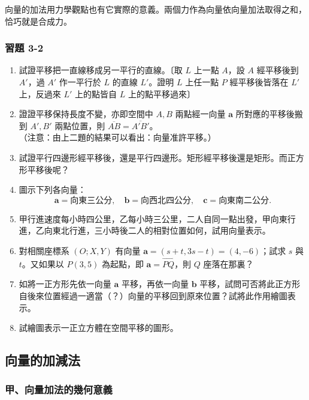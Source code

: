 向量的加法用力學觀點也有它實際的意義。兩個力作為向量依向量加法取得之和，恰巧就是合成力。

\subsubsection*{習題 3-2}

\begin{enumerate}[label=\arabic*., leftmargin=2em]
  \item 試證平移把一直線移成另一平行的直線。〔取 $L$ 上一點 $A$，設 $A$ 經平移後到 $A'$，過 $A'$ 作一平行於 $L$ 的直線 $L'$。證明 $L$ 上任一點 $P$ 經平移後皆落在 $L'$ 上，反過來 $L'$ 上的點皆自 $L$ 上的點平移過來〕
  \item 證證平移保持長度不變，亦即空間中 $A, B$ 兩點經一向量 $\mathbf{a}$ 所對應的平移後搬到 $A', B'$ 兩點位置，則 $\overline{AB} = \overline{A'B'}$。\\
  （注意：由上二題的結果可以看出：向量准許平移。）
  \item 試證平行四邊形經平移後，還是平行四邊形。矩形經平移後還是矩形。而正方形平移後呢？
  \item 圖示下列各向量：
  \[ \mathbf{a} = \text{向東三公分}, \quad \mathbf{b} = \text{向西北四公分}, \quad \mathbf{c} = \text{向東南二公分}. \]
  \item 甲行進速度每小時四公里，乙每小時三公里，二人自同一點出發，甲向東行進，乙向東北行進，三小時後二人的相對位置如何，試用向量表示。
  \item 對相關座標系 $(O; X, Y)$ 有向量 $\mathbf{a} = (s + t, 3s - t) = (4, -6)$；試求 $s$ 與 $t$。又如果以 $P(3, 5)$ 為起點，即 $\mathbf{a} = \vec{PQ}$，則 $Q$ 座落在那裏？
  \item 如將一正方形先依一向量 $\mathbf{a}$ 平移，再依一向量 $\mathbf{b}$ 平移，試問可否將此正方形自後來位置經過一適當（？）向量的平移回到原來位置？試將此作用繪圖表示。
  \item 試繪圖表示一正立方體在空間平移的圖形。
\end{enumerate}

\subsection{向量的加減法}
\label{sec:b3-3-3}

\subsubsection*{甲、向量加法的幾何意義}

